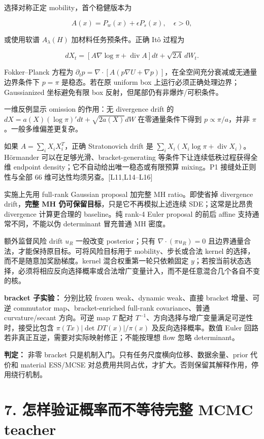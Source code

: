 \documentclass[
  11pt,
  a4paper,
]{article}
\begin{document}
选择对称正定 mobility，首个稳健版本为

\[A(x)=P_w(x)+\epsilon P_s(x),\quad \epsilon>0,\]

或使用软谱 \(A_\lambda(H)\) 加材料任务预条件。正确 Itô 过程为

\[dX_t=[A\nabla\log\pi+\operatorname{div}A]dt+\sqrt{2A}\,dW_t.\]

Fokker--Planck 方程为
\(\partial_t p=\nabla\cdot[A(p\nabla U+\nabla p)]\)，在全空间充分衰减或无通量边界条件下
\(p=\pi\) 是稳态。若在原 uniform box
上运行必须正确处理边界；Gaussianized 坐标避免有限 box
反射，但尾部仍有非爆炸/可积条件。

一维反例显示 omission 的作用：无 divergence drift 的
\(dX=a(X)(\log\pi)'dt+\sqrt{2a(X)}dW\) 在零通量条件下得到
\(p\propto\pi/a\)，并非 \(\pi\)。一般多维偏差更复杂。

如果 \(A=\sum_iX_iX_i^T\)，正确 Stratonovich drift 是
\(\sum_iX_i(X_i\log\pi+\operatorname{div}X_i)\)。Hörmander
可以在足够光滑、bracket-generating 等条件下让连续低秩过程获得全维
endpoint density；它不自动给出唯一稳态或有限预算 mixing。P1
接缝处正则性与全部 66 维可达性均须另查。{[}L11,L14--L16{]}

实施上先用 full-rank Gaussian proposal 加完整 MH ratio。即使省掉
divergence drift，\textbf{完整 MH 仍可保留目标}，只是它不再模拟上述连续
SDE；这常是比昂贵 divergence 计算更合理的 baseline。纯 rank-4 Euler
proposal 的前后 affine 支持通常不同，不能以伪 determinant 冒充普通 MH
密度。

额外监督风险 drift \(u_R\) 一般改变 posterior；只有
\(\nabla\cdot(\pi u_R)=0\)
且边界通量合法，才能保持原目标。可将风险目标用于 mobility、步长或合法
kernel 的选择，而不是随意加奖励梯度。kernel 混合权重第一轮只依赖固定
\(y\)；若按当前状态选择，必须将相应反向选择概率或合法增广变量计入，而不是任意混合几个各自不变的核。

\textbf{bracket 子实验：} 分别比较 frozen weak、dynamic weak、直接
bracket 增量、可逆 commutator map、bracket-enriched full-rank
covariance、普通 curvature/secant 方向。可逆 map \(T\) 配对
\(T^{-1}\)、方向选择与增广变量满足可逆性时，接受比包含
\(\pi(Tx)|\det DT(x)|/\pi(x)\) 及反向选择概率。数值 Euler
回路若非真正互逆，需要对实际映射修正；不能按理想 flow 忽略 determinant。

\textbf{判定：} 非零 bracket
只是机制入门。只有任务尺度横向位移、数据余量、prior 代价和 material
ESS/MCSE 对总费用共同占优，才扩大。否则保留其解释作用，停用绕行机制。

\hypertarget{ux600eux6837ux9a8cux8bc1ux6982ux7387ux800cux4e0dux7b49ux5f85ux5b8cux6574-mcmc-teacher}{%
\section{7. 怎样验证概率而不等待完整 MCMC
teacher}\label{ux600eux6837ux9a8cux8bc1ux6982ux7387ux800cux4e0dux7b49ux5f85ux5b8cux6574-mcmc-teacher}}
\end{document}

